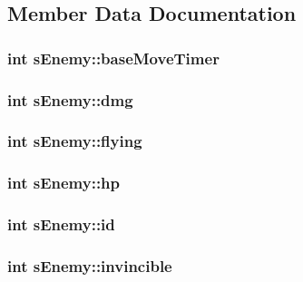 \subsection{Member Data Documentation}
\hypertarget{structs_enemy_aabc5707d86db96a7deca75934a8cb05f}{
\subsubsection[{base\-Move\-Timer}]{\setlength{\rightskip}{0pt plus 5cm}int s\-Enemy\-::base\-Move\-Timer}}\label{structs_enemy_aabc5707d86db96a7deca75934a8cb05f}
\hypertarget{structs_enemy_ac469a015604c8a1206eaacb5a9de3fae}{
\subsubsection[{dmg}]{\setlength{\rightskip}{0pt plus 5cm}int s\-Enemy\-::dmg}}\label{structs_enemy_ac469a015604c8a1206eaacb5a9de3fae}
\hypertarget{structs_enemy_a3564672ff00ff59fafdd7b00b7c89eac}{
\subsubsection[{flying}]{\setlength{\rightskip}{0pt plus 5cm}int s\-Enemy\-::flying}}\label{structs_enemy_a3564672ff00ff59fafdd7b00b7c89eac}
\hypertarget{structs_enemy_a1bd3cc9ffeda48c3b645bfc8e4e3bb02}{
\subsubsection[{hp}]{\setlength{\rightskip}{0pt plus 5cm}int s\-Enemy\-::hp}}\label{structs_enemy_a1bd3cc9ffeda48c3b645bfc8e4e3bb02}
\hypertarget{structs_enemy_abe78ad5ba13cad652d467e4fdb5681ed}{
\subsubsection[{id}]{\setlength{\rightskip}{0pt plus 5cm}int s\-Enemy\-::id}}\label{structs_enemy_abe78ad5ba13cad652d467e4fdb5681ed}
\hypertarget{structs_enemy_ab28dbc0855768585087a8ffbd2da9ddf}{
\subsubsection[{invincible}]{\setlength{\rightskip}{0pt plus 5cm}int s\-Enemy\-::invincible}}\label{structs_enemy_ab28dbc0855768585087a8ffbd2da9ddf}
